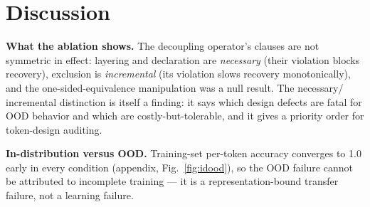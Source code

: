 \documentclass{article} %
\begin{document}
\begin{table}[h]
\centering
\small
{}
\caption{Robustness across model configurations (2 seeds per cell).}
\label{tab:robust}
\end{table}

\section{Discussion}

\textbf{What the ablation shows.} The decoupling operator's clauses
are not symmetric in effect: layering and declaration are
\emph{necessary} (their violation blocks recovery), exclusion is
\emph{incremental} (its violation slows recovery monotonically),
and the one-sided-equivalence manipulation was a null result. The
necessary/ incremental distinction is itself a finding: it says
which design defects are fatal for OOD behavior and which are
costly-but-tolerable, and it gives a priority order for token-design
auditing.

\textbf{In-distribution versus OOD.} Training-set
per-token accuracy converges to 1.0 early in every condition
(appendix, Fig.~\ref{fig:idood}), so the OOD failure cannot be
attributed to incomplete training --- it is a
representation-bound transfer failure, not a learning failure.
\end{document}
